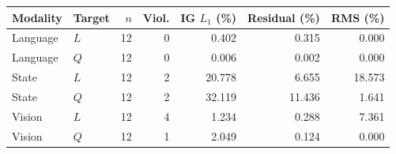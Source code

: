 \begin{tabular}{llrrrrr}
\toprule
Modality & Target & $n$ & Viol. & IG $L_1$ (\%) & Residual (\%) & RMS (\%) \\
\midrule
Language & $L$ & 12 & 0 & 0.402 & 0.315 & 0.000 \\
Language & $Q$ & 12 & 0 & 0.006 & 0.002 & 0.000 \\
State & $L$ & 12 & 2 & 20.778 & 6.655 & 18.573 \\
State & $Q$ & 12 & 2 & 32.119 & 11.436 & 1.641 \\
Vision & $L$ & 12 & 4 & 1.234 & 0.288 & 7.361 \\
Vision & $Q$ & 12 & 1 & 2.049 & 0.124 & 0.000 \\
\bottomrule
\end{tabular}
